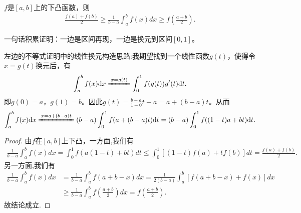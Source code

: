 \documentclass[../../main.tex]{subfiles}
\begin{document}
\begin{theorem}[Hadamard不等式]\label{theorem:Hadamard不等式}
\(f\)是\([a,b]\)上的下凸函数，则
\begin{align*}
\frac{f(a)+f(b)}{2} \geqslant \frac{1}{b - a}\int_{a}^{b}f(x)dx \geqslant f\left(\frac{a + b}{2}\right).
\end{align*} 
\end{theorem}
\begin{note}
一句话积累证明：一边是区间再现，一边是换元到区间\([0,1]\)。
\end{note}
\begin{remark}
左边的不等式证明中的线性换元构造思路:我期望找到一个线性函数$g(t)$，使得令$x = g(t)$换元后，有
\begin{align*}
\int_a^b f(x) \mathrm{d}x \xlongequal{x = g(t)} \int_0^1 f(g(t))g'(t) \mathrm{d}t.
\end{align*}
即$g(0) = a$，$g(1) = b$。因此$g(t) = \frac{b - a}{1 - 0}t + a = a + (b - a)t$。从而
\begin{align*}
\int_a^b f(x) \mathrm{d}x \xlongequal{x = a + (b - a)t} (b - a)\int_0^1 f(a + (b - a)t) \mathrm{d}t = (b - a)\int_0^1 f((1 - t)a + bt) \mathrm{d}t.
\end{align*} 
\end{remark}
\begin{proof}
由$f$在$[a,b]$上下凸，一方面,我们有
\begin{align*}
\frac{1}{b - a}\int_{a}^{b}f(x)dx = \int_{0}^{1}f(a(1 - t)+bt)dt \leqslant \int_{0}^{1}[(1 - t)f(a)+tf(b)]dt = \frac{f(a)+f(b)}{2}.
\end{align*}
另一方面,我们有
\begin{align*}
\frac{1}{b - a}\int_{a}^{b}f(x)dx &= \frac{1}{b - a}\int_{a}^{b}f(a + b - x)dx
= \frac{1}{2(b - a)}\int_{a}^{b}[f(a + b - x)+f(x)]dx\\
&\geqslant \frac{1}{b - a}\int_{a}^{b}f\left(\frac{a + b}{2}\right)dx
= f\left(\frac{a + b}{2}\right).
\end{align*}
故结论成立.
\end{proof}
\end{document}

